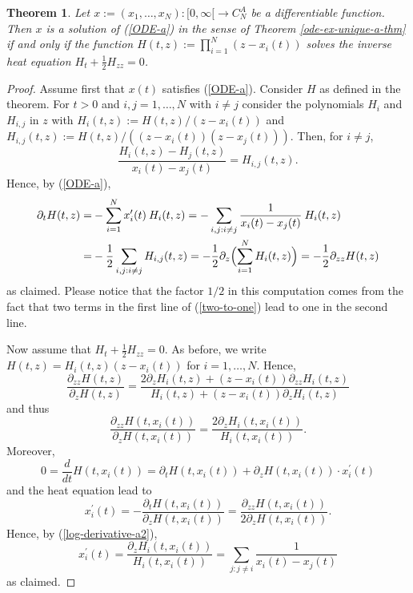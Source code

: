 \documentclass[reqno]{amsart}
\theoremstyle{plain}
\newtheorem{theorem}{Theorem}[section]
\theoremstyle{definition}
\numberwithin{equation}{section}
\begin{document}
\begin{theorem}\label{heat-equation-a}
  Let $x:=(x_1,\ldots,x_N):[0,\infty[\to C_N^A$ be a differentiable function.
      Then $x$ is a solution of (\ref{ODE-a}) in the sense of Theorem \ref{ode-ex-unique-a-thm}
      if and only if the function $H(t,z):=\prod_{i=1}^N (z-x_i(t))$
      solves the inverse heat equation $H_t+ \frac{1}{2}H_{zz}=0$.
\end{theorem}

\begin{proof}
  Assume first that $x(t)$ satisfies  (\ref{ODE-a}). Consider $H$ as defined in the theorem. For $t>0$ and $i,j=1,\ldots,N$ with $i\ne j$
  consider the polynomials $H_i$ and $H_{i,j}$ in $z$ with $H_i(t,z):=H(t,z)/(z-x_i(t))$ and  $H_{i,j}(t,z):=H(t,z)/((z-x_i(t))(z-x_j(t)))$.
  Then,  for $i\ne j$,
  \begin{equation}\label{two-to-one}
\frac{H_i(t,z)-H_j(t,z)}{x_i(t)-x_j(t)}=H_{i,j}(t,z).
    \end{equation}
  Hence, by (\ref{ODE-a}),
  \begin{align}
    \partial_t H(t,z)=&    -\sum_{i=1}^N x_i^\prime(t) \> H_i(t,z)=-\sum_{i,j: i\ne j} \frac{1}{x_i(t)-x_j(t)}\> H_i(t,z)\\
    =& - \frac{1}{2} \sum_{i,j: i\ne j }H_{i,j}(t,z) =  - \frac{1}{2}\partial_z\Bigl( \sum_{i=1}^N  H_i(t,z)\Bigr) =  - \frac{1}{2}\partial_{zz}  H(t,z)
\notag
\end{align}
  as claimed. Please notice that the factor $1/2$ in this computation comes from the fact that two terms  in the first line of (\ref{two-to-one})
   lead to one in the second line.

  Now assume that $H_t+ \frac{1}{2}H_{zz}=0$. As before, we write $H(t,z)=H_i(t,z)(z-x_i(t))$ for $i=1,\ldots,N$. Hence,
    \begin{equation}\label{log-derivative-a1}
      \frac{\partial_{zz}H(t,z)}{\partial_{z}H(t,z)}=
      \frac{2\partial_{z} H_i(t,z)+(z-x_i(t))\partial_{zz}H_i(t,z)}{H_i(t,z)+(z-x_i(t))\partial_{z}H_i(t,z)}
    \end{equation}
    and thus
     \begin{equation}\label{log-derivative-a2}
\frac{\partial_{zz}H(t,x_i(t))}{\partial_{z}H(t,x_i(t))}= \frac{2\partial_{z} H_i(t,x_i(t))}{H_i(t,x_i(t))}.
    \end{equation}
Moreover,
\begin{equation}\label{implicit} 0=\frac{d}{dt} H(t,x_i(t))= \partial_{t} H(t,x_i(t))+\partial_{z} H(t,x_i(t))\cdot x_i^\prime(t)
  \end{equation}
 and the heat equation lead to
 \begin{equation}\label{log-derivative-a3}
 x_i^\prime(t)=- \frac{\partial_{t} H(t,x_i(t))}{\partial_{z} H(t,x_i(t))} =  \frac{\partial_{zz} H(t,x_i(t))}{2\partial_{z} H(t,x_i(t))} .
 \end{equation}
 Hence, by (\ref{log-derivative-a2}),
 \begin{equation}\label{log-derivative-a4}
   x_i^\prime(t)=\frac{\partial_{z} H_i(t,x_i(t))}{H_i(t,x_i(t))}= \sum_{j:j\ne i} \frac{1}{x_i(t)-x_j(t)} \end{equation}
     as claimed.
\end{proof}
\end{document}
